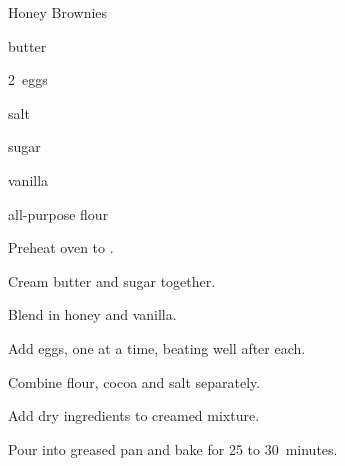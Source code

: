 \begin{recipe}{Honey Brownies}{}{}

\begin{ingredients}
\item \C{\third} butter
\item \C{\third} 
\item 2~eggs
\item \C{\third} 
\item \tp{\half} salt
\item \C{\threequarter} sugar
\item {} vanilla
\item \C{\half} all-purpose flour
\end{ingredients}

\begin{directions}
\item Preheat oven to .
\item Cream butter and sugar together.
\item Blend in honey and vanilla.
\item Add eggs, one at a time, beating well after each.
\item Combine flour, cocoa and salt separately.
\item Add dry ingredients to creamed mixture.
\item Pour into greased pan and bake for 25 to 30~minutes.
\end{directions}
\end{recipe}
